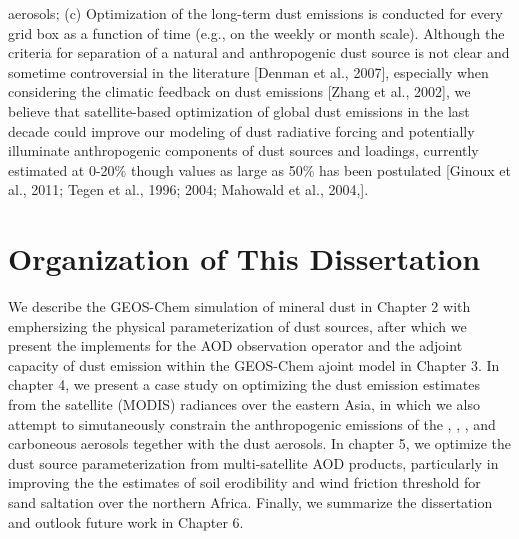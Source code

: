 aerosols; (c) Optimization of the long-term dust emissions is conducted for every grid box as a function of time (e.g., on the weekly or month scale). Although the criteria for separation of a natural and anthropogenic dust source is not clear and sometime controversial in the literature [Denman et al., 2007], especially when considering the climatic feedback on dust emissions [Zhang et al., 2002], we believe that satellite-based optimization of global dust emissions in the last decade could improve our modeling of dust radiative forcing and potentially illuminate anthropogenic components of dust sources and loadings, currently estimated at 0-20\% though values as large as 50\% has been postulated [Ginoux et al., 2011; Tegen et al., 1996; 2004; Mahowald et al., 2004,].

\section{Organization of This Dissertation}

 We describe the GEOS-Chem simulation of mineral dust in Chapter 2 with emphersizing the 
 physical parameterization of dust sources, after which we present the implements for the 
 AOD observation operator and the adjoint capacity of dust emission within the GEOS-Chem
 ajoint model in Chapter 3. In chapter 4, we present a case study on optimizing the dust 
 emission estimates from the satellite (MODIS) radiances over the eastern Asia, 
 in which we also attempt to 
 simutaneously constrain the anthropogenic emissions of the , , , 
 and carboneous aerosols tegether with the dust aerosols. In chapter 5, we optimize the 
 dust source parameterization from multi-satellite AOD products, particularly in improving 
 the the estimates of soil erodibility and wind friction threshold for sand saltation over 
 the northern Africa. Finally, we summarize the dissertation and outlook future work in 
 Chapter 6. 
